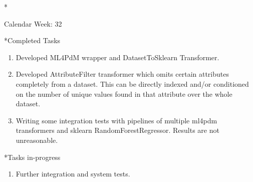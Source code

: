 \documentclass[11pt,a4paper]{article}
\begin{document}
\newpage
\begin{section}*{Calendar Week: 32 \hfill \date{13 August, 2021}}
	
	\begin{subsection}*{Completed Tasks}
		\begin{enumerate}
			\item Developed ML4PdM wrapper and DatasetToSklearn Transformer.
			\item Developed AttributeFilter transformer which omits certain attributes completely from a dataset. This can be directly indexed and/or conditioned on the number of unique values found in that attribute over the whole dataset.
			\item Writing some integration tests with pipelines of multiple ml4pdm transformers and sklearn RandomForestRegressor. Results are not unreasonable.
		\end{enumerate}
	\end{subsection}
	
	\begin{subsection}*{Tasks in-progress}
		\begin{enumerate}
			\item Further integration and system tests.
		\end{enumerate}
	\end{subsection}
	
\end{section}
\end{document}
